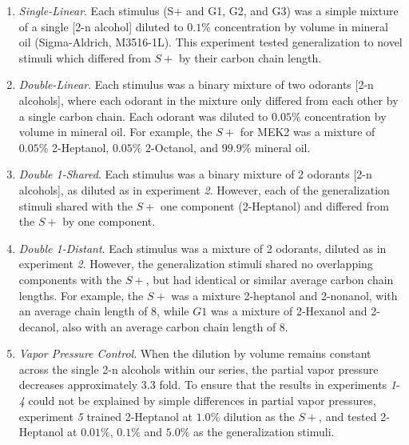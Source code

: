 \begin{enumerate}
\item \textit{Single-Linear}. Each stimulus (S+ and G1, G2, and G3) was a simple mixture of a single [2-n alcohol] diluted to $0.1\%$ concentration by volume in mineral oil (Sigma-Aldrich, M3516-1L). This experiment tested generalization to novel stimuli which differed from $S+$ by their carbon chain length.

\item \textit{Double-Linear}. Each stimulus was a binary mixture of two odorants [2-n alcohols], where each odorant in the mixture only differed from each other by a single carbon chain. Each odorant was diluted to $0.05\%$ concentration by volume in mineral oil. For example, the $S+$ for MEK2 was a mixture of $0.05\%$ 2-Heptanol, $0.05\%$ 2-Octanol, and $99.9\%$ mineral oil.  

\item \textit{Double 1-Shared}. Each stimulus was a binary mixture of 2 odorants [2-n alcohols], as diluted as in experiment \textit{2}. However, each of the generalization stimuli shared with the $S+$ one component (2-Heptanol) and differed from the $S+$ by one component. 

\item \textit{Double 1-Distant}. Each stimulus was a mixture of 2 odorants, diluted as in experiment \textit{2}. However, the generalization stimuli shared no overlapping components with the $S+$, but had identical or similar average carbon chain lengths. For example, the $S+$ was a mixture 2-heptanol and 2-nonanol, with an average chain length of 8, while $G1$ was a mixture of 2-Hexanol and 2-decanol, also with an average carbon chain length of 8.

\item \textit{Vapor Pressure Control}. When the dilution by volume remains constant across the single 2-n alcohols within our series, the partial vapor pressure decreases approximately 3.3 fold. To ensure that the results in experiments \textit{1}-\textit{4} could not be explained by simple differences in partial vapor pressures, experiment \textit{5} trained 2-Heptanol at $1.0\%$ dilution as the $S+$, and tested 2-Heptanol at $0.01\%$, $0.1\%$ and $5.0\%$ as the generalization stimuli.

\end{enumerate}
